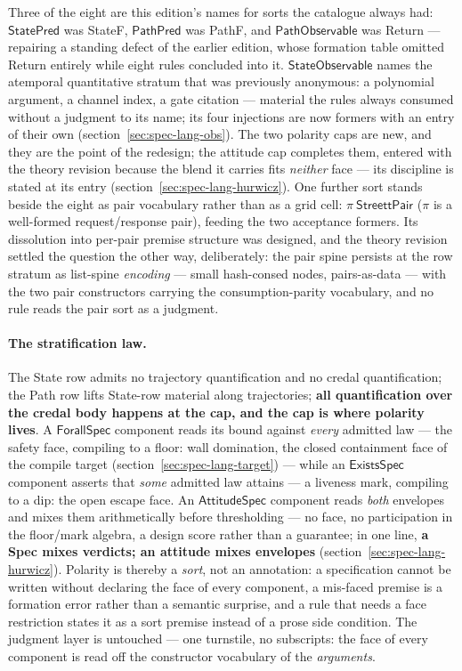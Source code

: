 Three of the eight are this edition's names for sorts the catalogue
always had: $\mathsf{StatePred}$ was \textsf{StateF},
$\mathsf{PathPred}$ was \textsf{PathF}, and $\mathsf{PathObservable}$
was \textsf{Return} --- repairing a standing defect of the earlier
edition, whose formation table omitted \textsf{Return} entirely while
eight rules concluded into it. $\mathsf{StateObservable}$ names the
atemporal quantitative stratum that was previously anonymous: a
polynomial argument, a channel index, a gate citation --- material
the rules always consumed without a judgment to its name; its four
injections are now formers with an entry of their own
(section~\ref{sec:spec-lang-obs}). The two polarity caps are new,
and they are the point of the redesign; the attitude cap completes
them, entered with the theory revision because the blend it carries
fits \emph{neither} face --- its discipline is stated at its entry
(section~\ref{sec:spec-lang-hurwicz}). One further sort stands
beside the eight as pair vocabulary rather than as a grid cell:
$\pi\ \mathsf{StreettPair}$ ($\pi$ is a well-formed request/response
pair), feeding the two acceptance formers. Its dissolution into
per-pair premise structure was designed, and the theory revision
settled the question the other way, deliberately: the pair spine
persists at the row stratum as list-spine \emph{encoding} --- small
hash-consed nodes, pairs-as-data --- with the two pair constructors
carrying the consumption-parity vocabulary, and no rule reads the
pair sort as a judgment.

\paragraph{The stratification law.} The State row admits no
trajectory quantification and no credal quantification; the Path row
lifts State-row material along trajectories; \textbf{all
quantification over the credal body happens at the cap, and the cap
is where polarity lives}. A $\mathsf{ForallSpec}$ component reads its
bound against \emph{every} admitted law --- the safety face,
compiling to a floor: wall domination, the closed containment face of
the compile target (section~\ref{sec:spec-lang-target}) --- while an
$\mathsf{ExistsSpec}$ component asserts that \emph{some} admitted law
attains --- a liveness mark, compiling to a dip: the open escape
face. An $\mathsf{AttitudeSpec}$ component reads \emph{both}
envelopes and mixes them arithmetically before thresholding --- no
face, no participation in the floor/mark algebra, a design score
rather than a guarantee; in one line, \textbf{a Spec mixes verdicts;
an attitude mixes envelopes} (section~\ref{sec:spec-lang-hurwicz}).
Polarity is thereby a \emph{sort}, not an annotation: a
specification cannot be written without declaring the face of every
component, a mis-faced premise is a formation error rather than a
semantic surprise, and a rule that needs a face restriction states it
as a sort premise instead of a prose side condition. The judgment
layer is untouched --- one turnstile, no subscripts: the face of
every component is read off the constructor vocabulary of the
\emph{arguments}.

